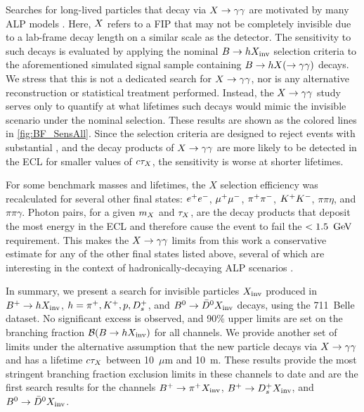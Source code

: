 Searches for long-lived particles that decay via $X\rightarrow\gamma\gamma$ are motivated by many ALP models \cite{Agrawal_2021,Izaguirre_2017}. Here, $X$ refers to a FIP that may not be completely invisible due to a lab-frame decay length on a similar scale as the detector. The sensitivity to such decays is evaluated by applying the nominal $B\rightarrow hX_{\rm{inv}}$ selection criteria to the aforementioned simulated signal sample containing $B\rightarrow hX(\rightarrow\gamma\gamma)$ decays. We stress that this is not a dedicated search for $X\rightarrow\gamma\gamma$, nor is any alternative reconstruction or statistical treatment performed. Instead, the $X\rightarrow\gamma\gamma$ study serves only to quantify at what lifetimes such decays would mimic the invisible scenario under the nominal selection. These results are shown as the colored lines in \cref{fig:BF_SensAll}. Since the selection criteria are designed to reject events with substantial \eecl, and the decay products of $X\rightarrow\gamma\gamma$ are more likely to be detected in the ECL for smaller values of $c\tau_{X}$, the sensitivity is worse at shorter lifetimes.

For some benchmark masses and lifetimes, the $X$ selection efficiency was recalculated for several other final states: $e^+e^-$, $\mu^+\mu^-$, $\pi^+\pi^-$, $K^+K^-$, $\pi\pi\eta$, and $\pi\pi\gamma$. Photon pairs, for a given $m_{X}$ and $\tau_{X}$, are the decay products that deposit the most energy in the ECL and therefore cause the event to fail the \eecl $<1.5~\mathrm{\,Ge\kern -0.1em V}$ requirement. This makes the $X\rightarrow\gamma\gamma$ limits from this work a conservative estimate for any of the other final states listed above, several of which are interesting in the context of hadronically-decaying ALP scenarios \cite{PhysRevLett.123.031803,balkin2025covariantdescriptioninteractionsaxionlike}.


In summary, we present a search for invisible particles $X_{\rm{inv}}$ produced in $B^+\rightarrow hX_{\rm{inv}}$, $h = \pi^+,K^+,p,D^+_s$, and $B^0\rightarrow\kern 0.2em\bar{\kern -0.2em D}{}^0X_{\rm{inv}}$ decays, using the 711~\invfb Belle dataset. No significant excess is observed, and 90\% upper limits are set on the branching fraction $\mathcal{B}(B \rightarrow hX_{\rm{inv}})$ for all channels. We provide another set of limits under the alternative assumption that the new particle decays via $X\rightarrow\gamma\gamma$ and has a lifetime $c\tau_{X}$ between 10~$\mu$m and 10~m. These results provide the most stringent branching fraction exclusion limits in these channels to date and are the first search results for the channels $B^+\rightarrow\pi^+X_{\rm{inv}}$, $B^+\rightarrow D^+_sX_{\rm{inv}}$, and $B^0\rightarrow\kern 0.2em\bar{\kern -0.2em D}{}^0X_{\rm{inv}}$.

